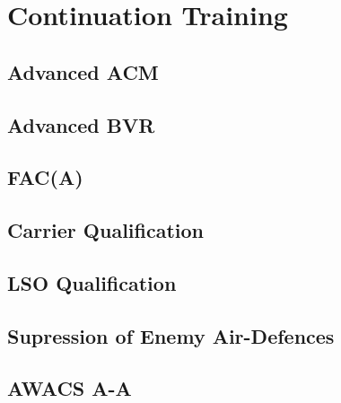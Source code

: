 \part{Continuation Training}
  \chapter{Advanced ACM}
  \chapter{Advanced BVR}
  \chapter{FAC(A)}
  \chapter{Carrier Qualification}
  \chapter{LSO Qualification}
  \chapter{Supression of Enemy Air-Defences}
  \chapter{AWACS A-A}